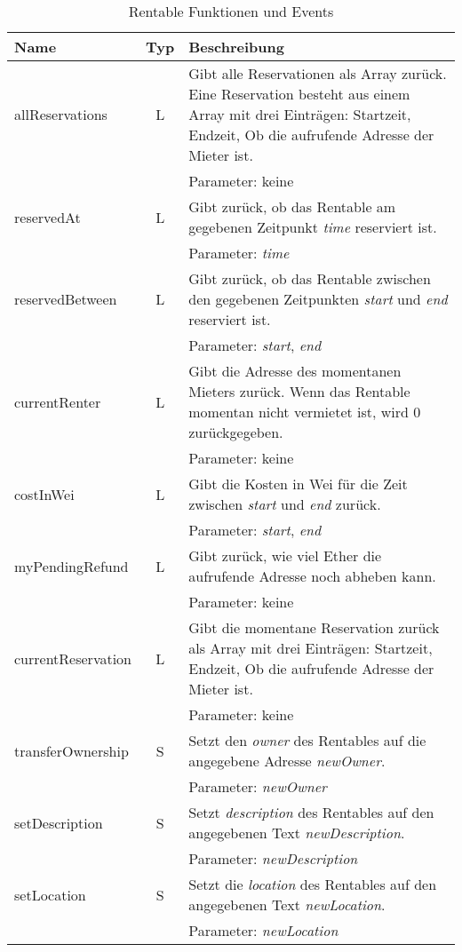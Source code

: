 \begin{longtable}{@{}lcL{9cm}@{}}
\caption{Rentable Funktionen und Events}\label{tbl:Rentable_Funktionsuebersicht}\\
\toprule
Name & Typ & Beschreibung \\ \midrule
allReservations     & L   & Gibt alle Reservationen als Array zurück. Eine Reservation besteht aus einem Array mit drei Einträgen: Startzeit, Endzeit, Ob die aufrufende Adresse der Mieter ist.\\
 & & Parameter: keine \\\midrule
reservedAt          & L   & Gibt zurück, ob das Rentable am gegebenen Zeitpunkt \emph{time} reserviert ist.\\ & & Parameter: \emph{time} \\\midrule
reservedBetween     & L   & Gibt zurück, ob das Rentable zwischen den gegebenen Zeitpunkten \emph{start} und \emph{end} reserviert ist.\\ & & Parameter: \emph{start}, \emph{end} \\\midrule
currentRenter       & L   & Gibt die Adresse des momentanen Mieters zurück. Wenn das Rentable momentan nicht vermietet ist, wird 0 zurückgegeben.\\ & & Parameter: keine \\\midrule
costInWei           & L   & Gibt die Kosten in Wei für die Zeit zwischen \emph{start} und \emph{end} zurück.\\ & & Parameter: \emph{start}, \emph{end} \\\midrule
myPendingRefund     & L   & Gibt zurück, wie viel Ether die aufrufende Adresse noch abheben kann.\\ & & Parameter: keine \\ \midrule
currentReservation  & L   & Gibt die momentane Reservation zurück als Array mit drei Einträgen: Startzeit, Endzeit, Ob die aufrufende Adresse der Mieter ist.\\ & & Parameter: keine \\\midrule
transferOwnership   & S   & Setzt den \emph{owner} des Rentables auf die angegebene Adresse \emph{newOwner}.\\ & & Parameter: \emph{newOwner} \\\midrule
setDescription   & S   & Setzt \emph{description} des Rentables auf den angegebenen Text \emph{newDescription}.\\ & & Parameter: \emph{newDescription} \\\midrule
setLocation   & S   & Setzt die \emph{location} des Rentables auf den angegebenen Text \emph{newLocation}.\\ & & Parameter: \emph{newLocation} \\\midrule

\end{longtable}
